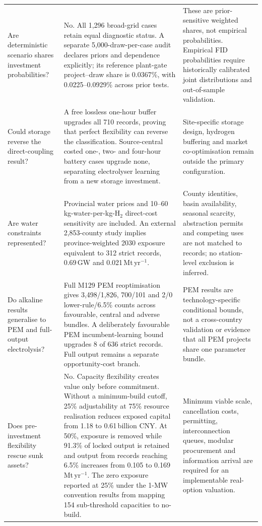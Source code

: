 \documentclass[pdflatex,sn-nature]{sn-jnl}
\begin{document}
\begin{longtable}{>{\raggedright\arraybackslash}p{}>{\raggedright\arraybackslash}p{}>{\raggedright\arraybackslash}p{}}
Are deterministic scenario shares investment probabilities? & No. All 1,296 broad-grid cases retain equal diagnostic status. A separate 5,000-draw-per-case audit declares priors and dependence explicitly; its reference plant-gate project--draw share is 0.0367\%, with 0.0225--0.0929\% across prior tests. & These are prior-sensitive weighted shares, not empirical probabilities. Empirical FID probabilities require historically calibrated joint distributions and out-of-sample validation. \\
Could storage reverse the direct-coupling result? & A free lossless one-hour buffer upgrades all 710 records, proving that perfect flexibility can reverse the classification. Source-central costed one-, two- and four-hour battery cases upgrade none, separating electrolyser learning from a new storage investment. & Site-specific storage design, hydrogen buffering and market co-optimisation remain outside the primary configuration. \\
Are water constraints represented? & Provincial water prices and 10--60\,kg-water-per-kg-H$_2$ direct-cost sensitivity are included. An external 2,853-county study implies province-weighted 2030 exposure equivalent to 312 strict records, 0.69\,GW and 0.021\,Mt\,yr$^{-1}$. & County identities, basin availability, seasonal scarcity, abstraction permits and competing uses are not matched to records; no station-level exclusion is inferred. \\
Do alkaline results generalise to PEM and full-output electrolysis? & Full M129 PEM reoptimisation gives 3,498/1,826, 700/101 and 2/0 lower-rule/6.5\% counts across favourable, central and adverse bundles. A deliberately favourable PEM incumbent-learning bound upgrades 8 of 636 strict records. Full output remains a separate opportunity-cost branch. & PEM results are technology-specific conditional bounds, not a cross-country validation or evidence that all PEM projects share one parameter bundle. \\
Does pre-investment flexibility rescue sunk assets? & No. Capacity flexibility creates value only before commitment. Without a minimum-build cutoff, 25\% adjustability at 75\% resource realisation reduces exposed capital from 1.18 to 0.61\,billion CNY. At 50\%, exposure is removed while 91.3\% of locked output is retained and output from records reaching 6.5\% increases from 0.105 to 0.169\,Mt\,yr$^{-1}$. The zero exposure reported at 25\% under the 1-MW convention results from mapping 154 sub-threshold capacities to no-build. & Minimum viable scale, cancellation costs, permitting, interconnection queues, modular procurement and information arrival are required for an implementable real-option valuation. \\

\end{longtable}
\end{document}
